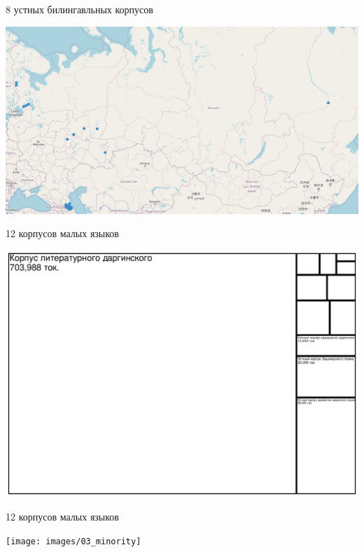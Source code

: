 \documentclass[
  ignorenonframetext,
]{beamer}
\begin{document}
\begin{frame}{8 устных билингавльных корпусов}
\protect\hypertarget{ux443ux441ux442ux43dux44bux445-ux431ux438ux43bux438ux43dux433ux430ux432ux43bux44cux43dux44bux445-ux43aux43eux440ux43fux443ux441ux43eux432-1}{}
\begin{center}\includegraphics[width=0.99\linewidth]{images/02_bilinguals} \end{center}
\end{frame}

\begin{frame}{12 корпусов малых языков}
\protect\hypertarget{ux43aux43eux440ux43fux443ux441ux43eux432-ux43cux430ux43bux44bux445-ux44fux437ux44bux43aux43eux432}{}
\begin{center}\includegraphics[width=0.99\linewidth]{2023.12.14_4nv_files/figure-beamer/unnamed-chunk-9-1} \end{center}
\end{frame}

\begin{frame}{12 корпусов малых языков}
\protect\hypertarget{ux43aux43eux440ux43fux443ux441ux43eux432-ux43cux430ux43bux44bux445-ux44fux437ux44bux43aux43eux432-1}{}
\begin{center}\texttt{[image: images/03\_minority]} \end{center}
\end{frame}
\end{document}
